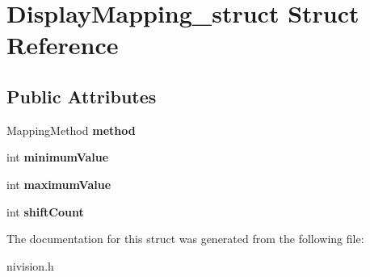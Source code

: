 \hypertarget{structDisplayMapping__struct}{\section{\-Display\-Mapping\-\_\-struct \-Struct \-Reference}
\label{structDisplayMapping__struct}
}
\subsection*{\-Public \-Attributes}
\begin{DoxyCompactItemize}
\item 
\hypertarget{structDisplayMapping__struct_aa364e1e9956c18eeb2474fef9ee14c87}{\-Mapping\-Method {\bfseries method}}\label{structDisplayMapping__struct_aa364e1e9956c18eeb2474fef9ee14c87}

\item 
\hypertarget{structDisplayMapping__struct_a49cef936a2beae40e29127ff5b674e04}{int {\bfseries minimum\-Value}}\label{structDisplayMapping__struct_a49cef936a2beae40e29127ff5b674e04}

\item 
\hypertarget{structDisplayMapping__struct_ac0ee2521d09af4ac69e3a80a6c5aa0fa}{int {\bfseries maximum\-Value}}\label{structDisplayMapping__struct_ac0ee2521d09af4ac69e3a80a6c5aa0fa}

\item 
\hypertarget{structDisplayMapping__struct_a675da1584800b0b6621e061528bc734b}{int {\bfseries shift\-Count}}\label{structDisplayMapping__struct_a675da1584800b0b6621e061528bc734b}

\end{DoxyCompactItemize}


\-The documentation for this struct was generated from the following file\-:\begin{DoxyCompactItemize}
\item 
nivision.\-h\end{DoxyCompactItemize}
